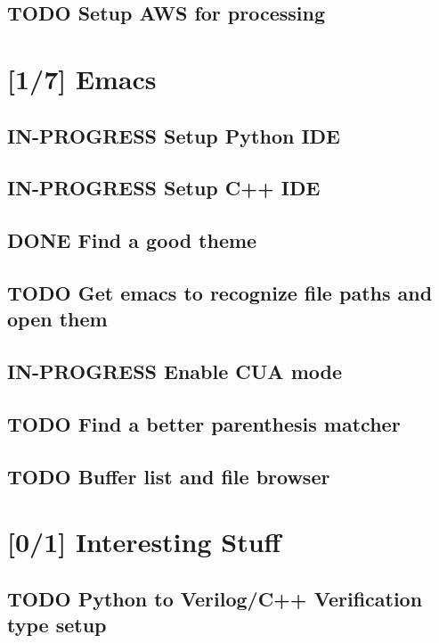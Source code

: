 \documentclass[11pt]{article}
\begin{document}
\subsection{{\bfseries\sffamily TODO} Setup AWS for processing}
\label{sec:orgc35f107}

\section{[1/7] Emacs}
\label{sec:org518566c}
\subsection{{\bfseries\sffamily IN-PROGRESS} Setup Python IDE}
\label{sec:orgbb0e2d5}
\subsection{{\bfseries\sffamily IN-PROGRESS} Setup C++ IDE}
\label{sec:org80a08ee}
\subsection{{\bfseries\sffamily DONE} Find a good theme}
\label{sec:org96c18c8}
\subsection{{\bfseries\sffamily TODO} Get emacs to recognize file paths and open them}
\label{sec:org3919c67}
\subsection{{\bfseries\sffamily IN-PROGRESS} Enable CUA mode}
\label{sec:org97df42f}
\subsection{{\bfseries\sffamily TODO} Find a better parenthesis matcher}
\label{sec:org2e20f50}
\subsection{{\bfseries\sffamily TODO} Buffer list and file browser}
\label{sec:orgc2595f8}

\section{[0/1] Interesting Stuff}
\label{sec:org598614b}
\subsection{{\bfseries\sffamily TODO} Python to Verilog/C++ Verification type setup}
\label{sec:orge25d46e}
\end{document}
